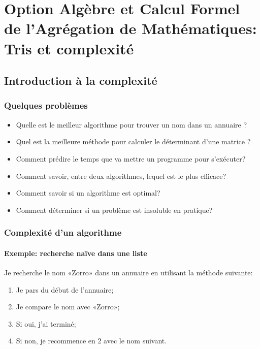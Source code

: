 \section{Option Algèbre et Calcul Formel de l'Agrégation de
Mathématiques: Tris et complexité}

\subsection{Introduction à la complexité}

\subsubsection{Quelques problèmes}

\begin{itemize}
\item
  Quelle est le meilleur algorithme pour trouver un nom dans un annuaire
  ?
\item
  Quel est la meilleure méthode pour calculer le déterminant d'une
  matrice ?
\item
  Comment prédire le temps que va mettre un programme pour s'exécuter?
\item
  Comment savoir, entre deux algorithmes, lequel est le plus efficace?
\item
  Comment savoir si un algorithme est optimal?
\item
  Comment déterminer si un problème est insoluble en pratique?
\end{itemize}

\subsubsection{Complexité d'un algorithme}

\paragraph{Exemple: recherche naïve dans une liste}

Je recherche le nom «Zorro» dans un annuaire en utilisant la méthode
suivante:

\begin{enumerate}
\item
  Je pars du début de l'annuaire;
\item
  Je compare le nom avec «Zorro»;
\item
  Si oui, j'ai terminé;
\item
  Si non, je recommence en 2 avec le nom suivant.
\end{enumerate}

